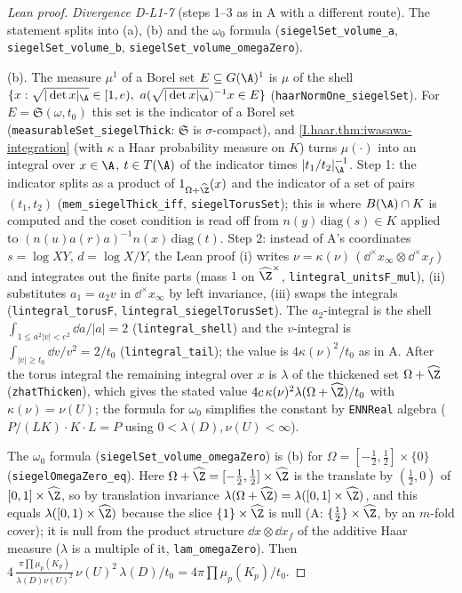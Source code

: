 \begin{proof}[Lean proof]
\emph{Divergence D-L1-7} (steps 1--3 as in A with a different route). The statement splits into (a), (b) and the $\omega_0$ formula (\texttt{siegelSet\_volume\_a}, \texttt{siegelSet\_volume\_b}, \texttt{siegelSet\_volume\_omegaZero}).

(b). The measure $\mu^1$ of a Borel set $E\subseteq G(\A)^1$ is $\mu$ of the shell $\{x:\sqrt{|\det x|_\A}\in[1,e),\ a(\sqrt{|\det x|_\A})^{-1}x\in E\}$ (\texttt{haarNormOne\_siegelSet}). For $E=\mathfrak S(\omega,t_0)$ this set is the indicator of a Borel set (\texttt{measurableSet\_siegelThick}: $\mathfrak S$ is $\sigma$-compact), and \cref{I.haar.thm:iwasawa-integration} (with $\kappa$ a Haar probability measure on $K$) turns $\mu(\cdot)$ into an integral over $x\in\A$, $t\in T(\A)$ of the indicator times $|t_1/t_2|_\A^{-1}$. Step 1: the indicator splits as a product of $1_{\Omega+\widehat\Z}(x)$ and the indicator of a set of pairs $(t_1,t_2)$ (\texttt{mem\_siegelThick\_iff}, \texttt{siegelTorusSet}); this is where $B(\A)\cap K$ is computed and the coset condition is read off from $n(y)\,\mathrm{diag}(s)\in K$ applied to $(n(u)a(r)a)^{-1}n(x)\,\mathrm{diag}(t)$. Step 2: instead of A's coordinates $s=\log XY$, $d=\log X/Y$, the Lean proof (i) writes $\nu=\kappa(\nu)\,(\dd^\times x_\infty\otimes\dd^\times x_f)$ and integrates out the finite parts (mass $1$ on $\widehat\Z^\times$, \texttt{lintegral\_unitsF\_mul}), (ii) substitutes $a_1=a_2v$ in $\dd^\times x_\infty$ by left invariance, (iii) swaps the integrals (\texttt{lintegral\_torusF}, \texttt{lintegral\_siegelTorusSet}). The $a_2$-integral is the shell $\int_{1\le a^2|v|<e^2}\dd a/|a|=2$ (\texttt{lintegral\_shell}) and the $v$-integral is $\int_{|v|\ge t_0}\dd v/v^2=2/t_0$ (\texttt{lintegral\_tail}); the value is $4\kappa(\nu)^2/t_0$ as in A. After the torus integral the remaining integral over $x$ is $\lambda$ of the thickened set $\Omega+\widehat\Z$ (\texttt{zhatThicken}), which gives the stated value $4c\,\kappa(\nu)^2\lambda(\Omega+\widehat\Z)/t_0$ with $\kappa(\nu)=\nu(U)$; the formula for $\omega_0$ simplifies the constant by \texttt{ENNReal} algebra ($P/(LK)\cdot K\cdot L=P$ using $0<\lambda(D),\nu(U)<\infty$).

The $\omega_0$ formula (\texttt{siegelSet\_volume\_omegaZero}) is (b) for $\Omega=[-\tfrac12,\tfrac12]\times\{0\}$ (\texttt{siegelOmegaZero\_eq}). Here $\Omega+\widehat\Z=[-\tfrac12,\tfrac12]\times\widehat\Z$ is the translate by $(\tfrac12,0)$ of $[0,1]\times\widehat\Z$, so by translation invariance $\lambda(\Omega+\widehat\Z)=\lambda([0,1]\times\widehat\Z)$, and this equals $\lambda([0,1)\times\widehat\Z)$ because the slice $\{1\}\times\widehat\Z$ is null (A: $\{\tfrac12\}\times\widehat\Z$, by an $m$-fold cover); it is null from the product structure $\dd x\otimes\dd x_f$ of the additive Haar measure ($\lambda$ is a multiple of it, \texttt{lam\_omegaZero}). Then $4\,\frac{\pi\prod\mu_p(K_p)}{\lambda(D)\nu(U)^2}\,\nu(U)^2\,\lambda(D)/t_0=4\pi\prod\mu_p(K_p)/t_0$.


\end{proof}
